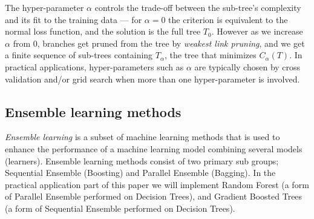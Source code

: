 \documentclass[10pt, a4paper, twocolumn]{article}
\begin{document}
					The hyper-parameter $\alpha$ controls the trade-off between the sub-tree's complexity and its fit to the training data --- for $\alpha=0$ the criterion is equivalent to the normal loss function, and the solution is the full tree $T_0$. However as we increase $\alpha$ from $0$, branches get pruned from the tree by \emph{weakest link pruning}, and we get a finite sequence of sub-trees containing $T_\alpha$, the tree that minimizes $C_{\alpha}(T)$. In practical applications, hyper-parameters such as $\alpha$ are typically chosen by cross validation and/or grid search when more than one hyper-parameter is involved.
					

		
	\subsection{Ensemble learning methods}
		\emph{Ensemble learning} is a subset of machine learning methods that is used to enhance the performance of a machine learning model combining several models (learners). Ensemble learning methods consist of two primary sub groups; Sequential Ensemble (Boosting) and Parallel Ensemble (Bagging). In the practical application part of this paper we will implement Random Forest (a form of Parallel Ensemble performed on Decision Trees), and Gradient Boosted Trees (a form of Sequential Ensemble performed on Decision Trees).		
\end{document}
